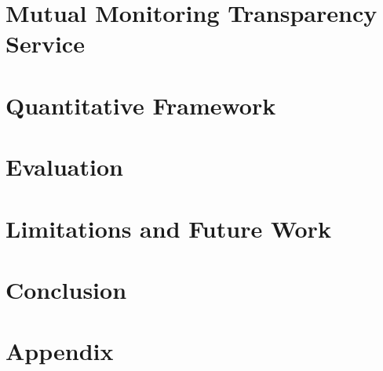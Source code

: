 \documentclass{jdf}
\begin{document}
\section{Mutual Monitoring Transparency Service}

\section{Quantitative Framework}

\section{Evaluation}

\section{Limitations and Future Work}

\section{Conclusion}

\section{Appendix}



\end{document}
